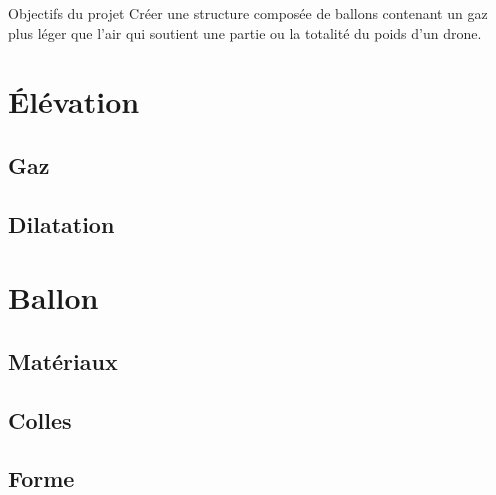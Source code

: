 \documentclass{beamer}
\begin{document}
\begin{frame}{Objectifs du projet}
  Créer une structure composée de ballons contenant un gaz plus léger que l’air qui soutient une partie ou la totalité du poids d'un drone.
\end{frame}


\section{Élévation}

\subsection{Gaz}

\begin{frame}{}
 
\end{frame}


\subsection{Dilatation}

\begin{frame}{}
 
\end{frame}


\section{Ballon}

\subsection{Matériaux}

\begin{frame}{}
 
\end{frame}


\subsection{Colles}

\begin{frame}{}
 
\end{frame}


\subsection{Forme}
\end{document}
